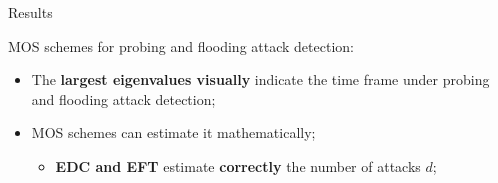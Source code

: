 \documentclass[newPxFont, numfooter, sectionpages]{beamer}
\begin{document}
\begin{frame}{Results}
	
	MOS schemes for probing and flooding attack detection:
	\begin{itemize}
		\item The \textbf{largest eigenvalues visually} indicate the time frame under probing and flooding attack detection;
		\item MOS schemes can estimate it mathematically;
		\begin{itemize}
			\item \textbf{EDC and EFT} estimate \textbf{correctly} the number of attacks $d$;
		\end{itemize}
	\end{itemize}

\end{frame}
\end{document}
